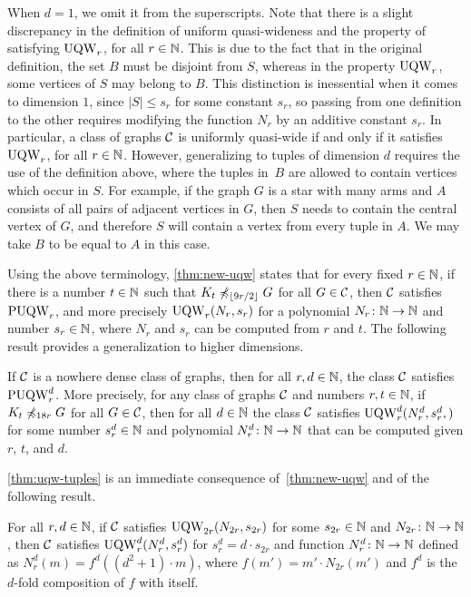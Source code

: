 When $d=1$, we omit it from the superscripts.
  Note that there is a slight discrepancy 
  in the definition of uniform quasi-wideness 
  and the property of satisfying $\uqw_r$, for all $r\in \N$.
  This is due to the fact that in the original definition,
  the set $B$ must be disjoint from $S$,
  whereas in the property $\uqw_r$, 
  some vertices of $S$ may belong to $B$. This distinction is inessential when it comes to dimension $1$, since $|S|\le s_r$ for some constant $s_r$,
  so passing from one definition to the other requires 
  modifying the function $N_r$ by an additive constant $s_r$.
In particular, a class of graphs $\cal C$ is uniformly quasi-wide if and only if it 
	satisfies $\uqw_r$, for all $r\in \N$.  
  However, generalizing to tuples of dimension $d$ requires the use of the definition above, where the tuples in~$B$ are allowed to contain  vertices which occur in $S$. 
  For example, if the graph $G$ is a star with many arms and $A$ consists of all pairs of adjacent vertices in $G$, then $S$
  needs to contain the central vertex of $G$,
  and therefore $S$ will contain a vertex from every tuple in $A$. We may take $B$ to be equal to $A$ in this case.
  
\medskip
	Using the above terminology, \cref{thm:new-uqw}
	states that for every fixed $r\in\N$, if there is a number $t\in\N$
	such that $K_t\not\minor_{\lfloor 9r/2\rfloor} G$ for all $G\in \cal C$,
	then $\cal C$ satisfies $\puqw_r$,
	and more precisely $\uqw_r(N_r,s_r)$
	for a polynomial $N_r\from\N\to\N$ and number $s_r\in \N$, where $N_r$ and $s_r$ can be computed from $r$ and $t$.
	The following result provides a generalization to higher dimensions.

\begin{theorem}\label{thm:uqw-tuples}If $\cal C$
	is a nowhere dense class of graphs,
	then for all $r,d\in\N$,
	the class $\cal C$ satisfies
	 $\puqw^d_r$.
	More precisely, for any class of graphs $\cal C$ and numbers $r,t\in\N$,
	if  	$K_t\not\minor_{18r} G$ for all $G\in \cal C$,
then for all $d\in \N$ the class $\cal C$ satisfies $\uqw^d_{r}(N^d_r,s^d_r,)$	for 
some number $s^d_r\in \N$ and polynomial $N^d_r\from \N\to\N$ that can be computed given $r$, $t$, and $d$.
\end{theorem}


\cref{thm:uqw-tuples} is an immediate consequence  of~\cref{thm:new-uqw} and of the following result.

\begin{proposition}\label{prop:uqw-tuples}
For all $r,d\in\N$,
if $\cal C$ satisfies $\uqw_{2r}(N_{2r},s_{2r})$ 
for some $s_{2r}\in\N$ and \mbox{$N_{2r}\colon\N\to \N$},
then $\cal C$
satisfies $\uqw^d_r(N^d_r,s^d_r)$
for  $s^d_r=d\cdot s_{2r}$ and 
function $N^d_r\colon \N\to \N$ defined as $N^d_r(m)=f^d((d^2+1)\cdot m)$, where $f(m')=m'\cdot N_{2r}(m')$ and $f^d$ is the $d$-fold composition of $f$ with itself.
\end{proposition}


